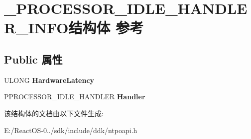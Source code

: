 \hypertarget{struct___p_r_o_c_e_s_s_o_r___i_d_l_e___h_a_n_d_l_e_r___i_n_f_o}{}\section{\+\_\+\+P\+R\+O\+C\+E\+S\+S\+O\+R\+\_\+\+I\+D\+L\+E\+\_\+\+H\+A\+N\+D\+L\+E\+R\+\_\+\+I\+N\+F\+O结构体 参考}
\label{struct___p_r_o_c_e_s_s_o_r___i_d_l_e___h_a_n_d_l_e_r___i_n_f_o}
\subsection*{Public 属性}
\begin{DoxyCompactItemize}
\item 
\mbox{\label{struct___p_r_o_c_e_s_s_o_r___i_d_l_e___h_a_n_d_l_e_r___i_n_f_o_a0330a2de5a3e4048646190d67a056499}} 
U\+L\+O\+NG {\bfseries Hardware\+Latency}
\item 
\mbox{\label{struct___p_r_o_c_e_s_s_o_r___i_d_l_e___h_a_n_d_l_e_r___i_n_f_o_af91d7106ba0c5bbebc9b21eb7d63e962}} 
P\+P\+R\+O\+C\+E\+S\+S\+O\+R\+\_\+\+I\+D\+L\+E\+\_\+\+H\+A\+N\+D\+L\+ER {\bfseries Handler}
\end{DoxyCompactItemize}


该结构体的文档由以下文件生成\+:\begin{DoxyCompactItemize}
\item 
E\+:/\+React\+O\+S-\/0../sdk/include/ddk/ntpoapi.\+h\end{DoxyCompactItemize}
